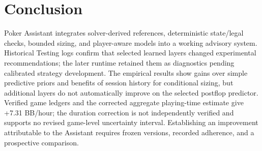 \documentclass[11pt]{article}
\begin{document}
\section{Conclusion}
Poker Assistant integrates solver-derived references, deterministic state/legal checks, bounded sizing, and player-aware models into a working advisory system. Historical Testing logs confirm that selected learned layers changed experimental recommendations; the later runtime retained them as diagnostics pending calibrated strategy development. The empirical results show gains over simple predictive priors and benefits of session history for conditional sizing, but additional layers do not automatically improve on the selected postflop predictor. Verified game ledgers and the corrected aggregate playing-time estimate give +7.31 BB/hour; the duration correction is not independently verified and supports no revised game-level uncertainty interval. Establishing an improvement attributable to the Assistant requires frozen versions, recorded adherence, and a prospective comparison.


\begingroup\small

\endgroup
\appendix

\end{document}
